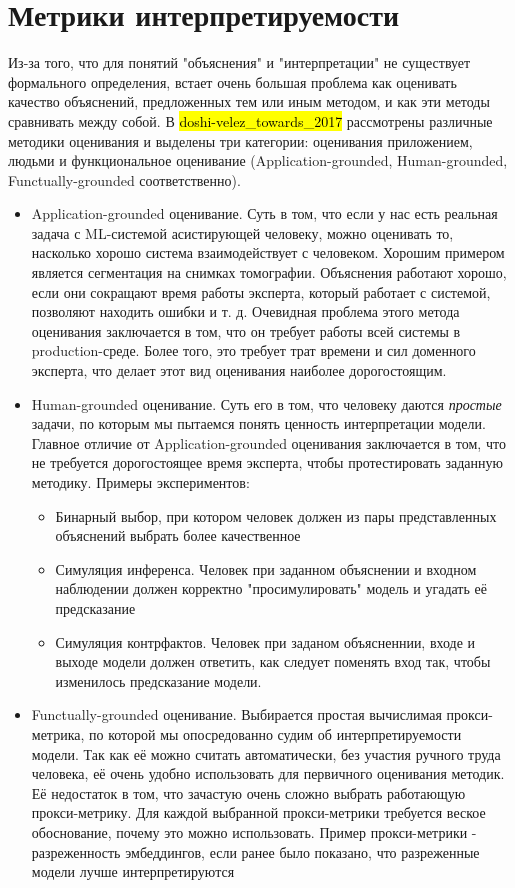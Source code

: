 \chapter{Метрики интерпретируемости}

Из-за того, что для понятий "объяснения" и "интерпретации" не существует формального определения, встает очень большая проблема как оценивать качество объяснений, предложенных тем или иным методом, и как эти методы сравнивать между собой. В \hl{doshi-velez_towards_2017} рассмотрены различные методики оценивания и выделены три категории: оценивания приложением, людьми и функциональное оценивание (Application-grounded, Human-grounded, Functually-grounded соответственно).

\begin{itemize}
    \item Application-grounded оценивание. Суть в том, что если у нас есть реальная задача с ML-системой асистирующей человеку, можно оценивать то, насколько хорошо система взаимодействует с человеком. Хорошим примером является сегментация на снимках томографии. Объяснения работают хорошо, если они сокращают время работы эксперта, который работает с системой, позволяют находить ошибки и т. д.
    Очевидная проблема этого метода оценивания заключается в том, что он требует работы всей системы в production-среде. Более того, это требует трат времени и сил доменного эксперта, что делает этот вид оценивания наиболее дорогостоящим. 
    \item Human-grounded оценивание. Суть его в том, что человеку даются \textit{простые} задачи, по которым мы пытаемся понять ценность интерпретации модели. Главное отличие от Application-grounded оценивания заключается в том, что не требуется дорогостоящее время эксперта, чтобы протестировать заданную методику. Примеры экспериментов:
    \begin{itemize}
        \item Бинарный выбор, при котором человек должен из пары представленных объяснений выбрать более качественное
        \item Симуляция инференса. Человек при заданном объяснении и входном наблюдении должен корректно "просимулировать" модель и угадать её предсказание
        \item Симуляция контрфактов. Человек при заданом объясненнии, входе и выходе модели должен ответить, как следует поменять вход так, чтобы изменилось предсказание модели.
    \end{itemize}
    \item Functually-grounded оценивание. Выбирается простая вычислимая прокси-метрика, по которой мы опосредованно судим об интерпретируемости модели. Так как её можно считать автоматически, без участия ручного труда человека, её очень удобно использовать для первичного оценивания методик. Её недостаток в том, что зачастую очень сложно выбрать работающую прокси-метрику. Для каждой выбранной прокси-метрики требуется веское обоснование, почему это можно использовать.
    Пример прокси-метрики - разреженность эмбеддингов, если ранее было показано, что разреженные модели лучше интерпретируются
\end{itemize}

